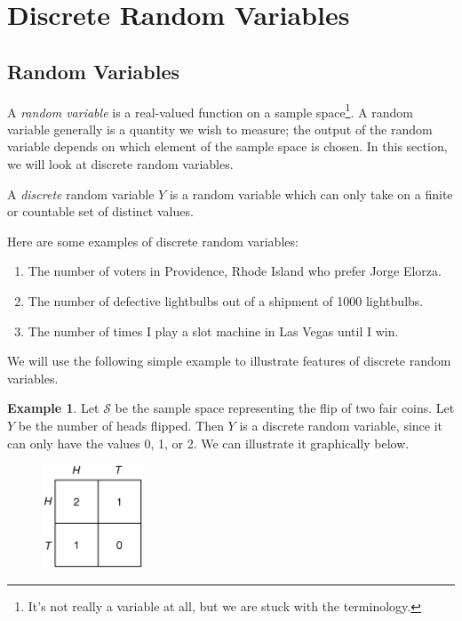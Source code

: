 \documentclass[12pt]{article}
\theoremstyle{definition}
\newtheorem*{example}{Example}
\theoremstyle{remark}
\def\cals{{\mathcal S}}
\begin{document}
\setcounter{section}{1}
\section{Discrete Random Variables}

\subsection{Random Variables}
A \emph{random variable} is a real-valued function on a sample space\footnote{It's not really a variable at all, but we are stuck with the terminology.}. A random variable generally is a quantity we wish to measure; the output of the random variable depends on which element of the sample space is chosen. In this section, we will look at discrete random variables.

\begin{framed}
A \emph{discrete} random variable $Y$ is a random variable which can only take on a finite or countable set of distinct values.
\end{framed}

Here are some examples of discrete random variables:
\begin{enumerate}
\item The number of voters in Providence, Rhode Island who prefer Jorge Elorza.
\item The number of defective lightbulbs out of a shipment of 1000 lightbulbs.
\item The number of times I play a slot machine in Las Vegas until I win.
\end{enumerate}

We will use the following simple example to illustrate features of discrete random variables.

\begin{example}Let $\cals$ be the sample space representing the flip of two fair coins. Let $Y$ be the number of heads flipped. Then $Y$ is a discrete random variable, since it can only have the values 0, 1, or 2. We can illustrate it graphically below.
\begin{figure}[H]
\centering
\includegraphics[width=3cm]{numberofheads.eps}
\end{figure}
\end{example}
\end{document}
